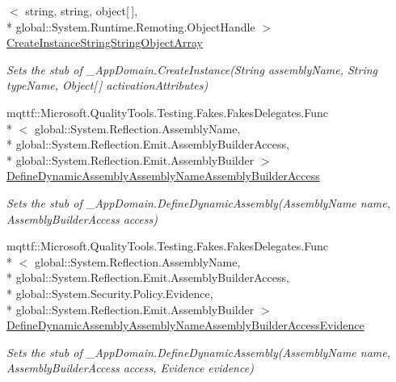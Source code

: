 \begin{DoxyCompactItemize}
$<$ string, string, object\mbox{[}$\,$\mbox{]}, \\*
global\-::\-System.\-Runtime.\-Remoting.\-Object\-Handle $>$ \hyperlink{class_system_1_1_fakes_1_1_stub___app_domain_adda47e1f03686b2e7ea8223f96e160de}{Create\-Instance\-String\-String\-Object\-Array}
\begin{DoxyCompactList}\small\item\em Sets the stub of \-\_\-\-App\-Domain.\-Create\-Instance(\-String assembly\-Name, String type\-Name, Object\mbox{[}$\,$\mbox{]} activation\-Attributes)\end{DoxyCompactList}\item 
mqttf\-::\-Microsoft.\-Quality\-Tools.\-Testing.\-Fakes.\-Fakes\-Delegates.\-Func\\*
$<$ global\-::\-System.\-Reflection.\-Assembly\-Name, \\*
global\-::\-System.\-Reflection.\-Emit.\-Assembly\-Builder\-Access, \\*
global\-::\-System.\-Reflection.\-Emit.\-Assembly\-Builder $>$ \hyperlink{class_system_1_1_fakes_1_1_stub___app_domain_a37d13d6ab34b03df75b686feb6e0ae40}{Define\-Dynamic\-Assembly\-Assembly\-Name\-Assembly\-Builder\-Access}
\begin{DoxyCompactList}\small\item\em Sets the stub of \-\_\-\-App\-Domain.\-Define\-Dynamic\-Assembly(\-Assembly\-Name name, Assembly\-Builder\-Access access)\end{DoxyCompactList}\item 
mqttf\-::\-Microsoft.\-Quality\-Tools.\-Testing.\-Fakes.\-Fakes\-Delegates.\-Func\\*
$<$ global\-::\-System.\-Reflection.\-Assembly\-Name, \\*
global\-::\-System.\-Reflection.\-Emit.\-Assembly\-Builder\-Access, \\*
global\-::\-System.\-Security.\-Policy.\-Evidence, \\*
global\-::\-System.\-Reflection.\-Emit.\-Assembly\-Builder $>$ \hyperlink{class_system_1_1_fakes_1_1_stub___app_domain_a71f929aa55e9aaa5d3797aed83972076}{Define\-Dynamic\-Assembly\-Assembly\-Name\-Assembly\-Builder\-Access\-Evidence}
\begin{DoxyCompactList}\small\item\em Sets the stub of \-\_\-\-App\-Domain.\-Define\-Dynamic\-Assembly(\-Assembly\-Name name, Assembly\-Builder\-Access access, Evidence evidence)\end{DoxyCompactList}\item 

\end{DoxyCompactItemize}
